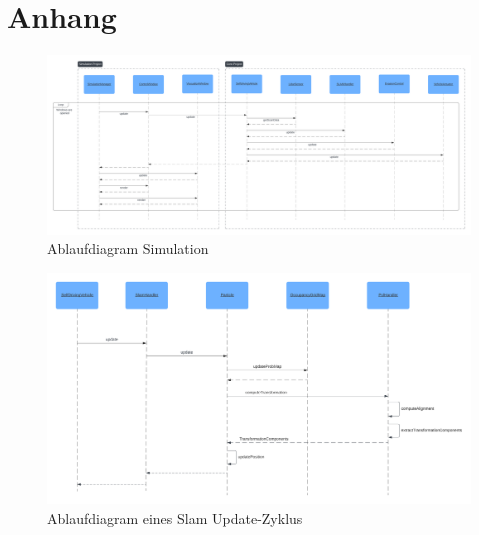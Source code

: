 \section{Anhang}

\begin{figure}[H]
    \centering
    \includegraphics[width=1\linewidth]{graphics/simulation_sequence_diagram.png}
    \caption{Ablaufdiagram Simulation}
    \label{fig:simulation_sequence_diagram}
\end{figure}

\begin{figure}[H]
    \centering
    \includegraphics[width=1\linewidth]{graphics/slam_sequence_diagram.png}
    \caption{Ablaufdiagram eines Slam Update-Zyklus}
    \label{fig:slam_sequence_diagram}
\end{figure}

\newpage
